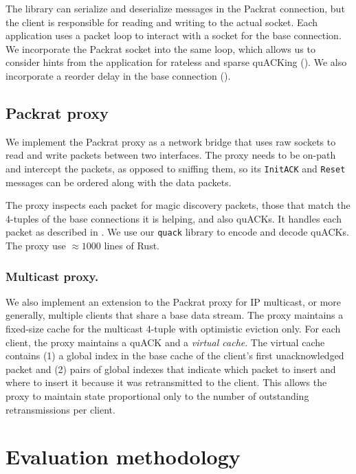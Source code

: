 The library can serialize and deserialize messages in the Packrat connection,
but the client is responsible for reading and writing to the actual socket.
Each application uses a packet loop to interact with a socket for the base
connection. We incorporate the Packrat socket into the same loop, which allows
us to consider hints from the application for rateless and sparse quACKing
(). We also incorporate a reorder delay in the
base connection ().

\subsection{Packrat proxy}
\label{sec:packrat:implementation:proxy}

We implement the Packrat proxy as a network bridge that uses raw sockets to read
and write packets between two interfaces. The proxy needs to
be on-path and intercept the packets, as opposed to sniffing them, so
its \texttt{InitACK} and \texttt{Reset} messages can be ordered along with the
data packets.

The proxy inspects each packet for magic discovery packets, those that match the
4-tuples of the base connections it is helping, and also quACKs. It handles
each packet as described in . We use
our \texttt{quack} library to encode and decode quACKs. The proxy use
$\approx\!1000$ lines of Rust.

\subsubsection{Multicast proxy.}

We also implement an extension to the Packrat proxy for IP multicast, or more
generally, multiple clients that share a base data stream. The proxy maintains
a fixed-size cache for the multicast 4-tuple with optimistic eviction only. For
each client, the proxy maintains a quACK and a \textit{virtual cache}. The
virtual cache contains (1) a global index in the base cache of the client's
first unacknowledged packet and (2) pairs of global indexes that indicate which
packet to insert and where to insert it because it was retransmitted to the
client. This allows the proxy to maintain state proportional only to the number
of outstanding retransmissions per client.

\section{Evaluation methodology}
\label{sec:packrat:methodology}

